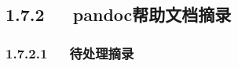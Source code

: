 \documentclass[letterpaper,12pt,english]{sphinxmanual}
\begin{document}
\subsection{1.7.2   pandoc帮助文档摘录}
\label{\detokenize{001software/001install/pandoc:id9}}

\subsubsection{1.7.2.1   待处理摘录}
\label{\detokenize{001software/001install/pandoc:id10}}
\begin{sphinxVerbatim}[commandchars=\\\{\}]
    
\end{sphinxVerbatim}
\end{document}
